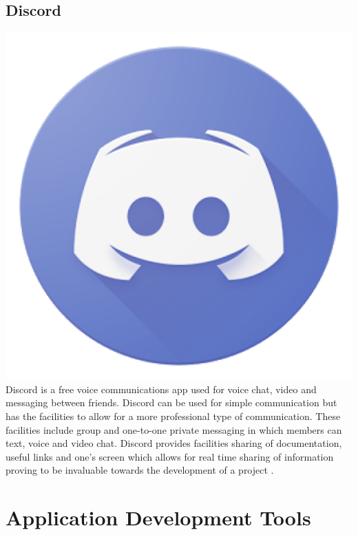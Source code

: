 \subsection{Discord}
\includegraphics[scale=0.025]{./img/Discord.PNG}
Discord is a free voice communications app used for voice chat, video and messaging between friends. Discord can be used for simple communication but has the facilities to allow for a more professional type of communication.  These facilities include group and one-to-one private messaging in which members can text, voice and video chat. Discord provides facilities sharing of documentation, useful links and one's screen which allows for real time sharing of information proving to be invaluable towards the development of a project \cite{discord}.

\section{Application Development Tools}

